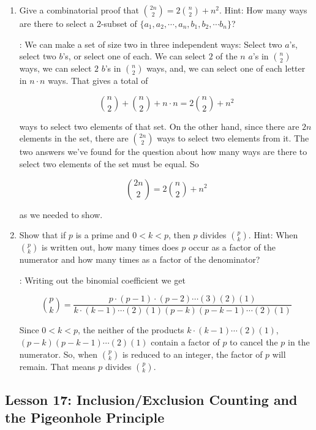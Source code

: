 \documentclass[11pt]{amsart}
\begin{document}
\begin{enumerate}


\item  Give a combinatorial  proof that $\displaystyle \binom{2n}{2} = 2\binom{n}{2} + n^2$.
\vskip 4pt
Hint: How many ways are there to select a 2-subset of $\{a_1,a_2,\cdots,a_n,b_1,b_2,\cdots b_n\}$?

: We can make a set of size two in three independent ways: Select two $a$'s, select
two $b$'s, or select one of each. We can select $2$ of the $n$ $a$'s in $\binom{n}{2}$ ways, we can select
$2$ $b$'s in $\binom{n}{2}$ ways, and, we can select one of each letter in $n\cdot n$ ways. That gives a 
total of

\[
\binom{n}{2} + \binom{n}{2} + n\cdot n = 2\binom{n}{2} + n^2
\]

ways to select two elements of that set. On the other hand, since there are $2n$ elements in the
set, there are $\binom{2n}{2}$ ways to select two elements from it. The two answers we've found for
the question about how many ways are there to select two elements of the set must be equal. So

\[
\binom{2n}{2} = 2\binom{n}{2} + n^2
\]

as we needed to show.

\medskip

\item Show that if $p$ is a prime and $0< k<p$, then $p$ divides $\displaystyle \binom{p}{k}$.
Hint: When $\displaystyle \binom{p}{k}$ is written out, how many times does $p$ occur as a factor
of the numerator and how many times as a factor of the denominator?

: Writing out the binomial coefficient we get

\[
\binom{p}{k} = \frac{p\cdot(p-1)\cdot(p-2)\cdots(3)(2)(1)}{k\cdot(k-1)\cdots(2)(1)(p-k)(p-k-1)\cdots(2)(1)}
\]

Since $0<k<p$, the neither of the products $k\cdot(k-1)\cdots(2)(1)$, $(p-k)(p-k-1)\cdots(2)(1)$ contain
a factor of $p$ to cancel the $p$ in the numerator. So, when $\displaystyle \binom{p}{k}$ is reduced to
an integer, the factor of $p$ will remain. That means $p$ divides $\displaystyle \binom{p}{k}$.

\end{enumerate}

\subsection{Lesson 17: Inclusion/Exclusion Counting and the Pigeonhole Principle}
\end{document}
